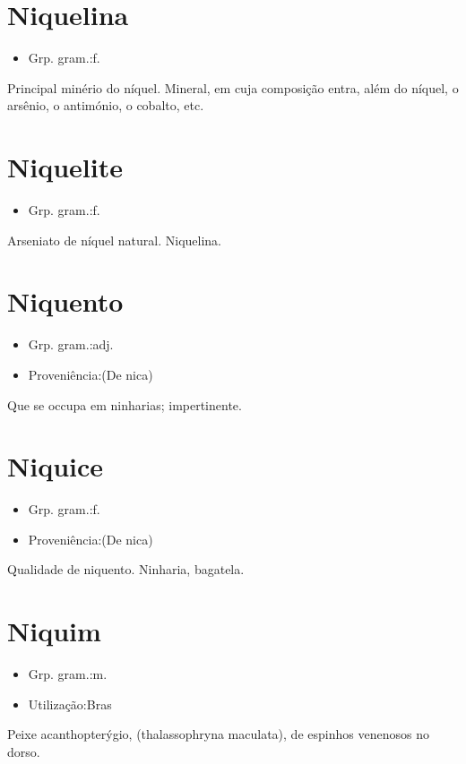 \section{Niquelina}
\begin{itemize}
\item {Grp. gram.:f.}
\end{itemize}
Principal minério do níquel.
Mineral, em cuja composição entra, além do níquel, o arsênio, o antimónio, o cobalto, etc.
\section{Niquelite}
\begin{itemize}
\item {Grp. gram.:f.}
\end{itemize}
Arseniato de níquel natural.
Niquelina.
\section{Niquento}
\begin{itemize}
\item {Grp. gram.:adj.}
\end{itemize}
\begin{itemize}
\item {Proveniência:(De \textunderscore nica\textunderscore )}
\end{itemize}
Que se occupa em ninharias; impertinente.
\section{Niquice}
\begin{itemize}
\item {Grp. gram.:f.}
\end{itemize}
\begin{itemize}
\item {Proveniência:(De \textunderscore nica\textunderscore )}
\end{itemize}
Qualidade de niquento.
Ninharia, bagatela.
\section{Niquim}
\begin{itemize}
\item {Grp. gram.:m.}
\end{itemize}
\begin{itemize}
\item {Utilização:Bras}
\end{itemize}
Peixe acanthopterýgio, (\textunderscore thalassophryna maculata\textunderscore ), de espinhos venenosos no dorso.
